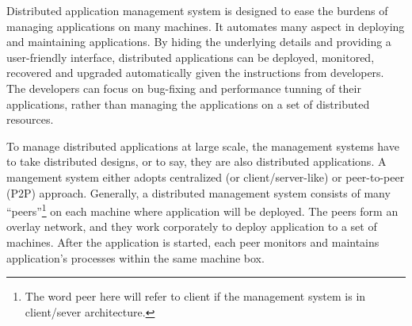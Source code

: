



Distributed application management system is designed to
ease the burdens of managing applications on many machines.
It automates many aspect in deploying and maintaining
applications. By hiding the underlying details and providing
a user-friendly interface, distributed applications can be
deployed, monitored, recovered and upgraded automatically
given the instructions from developers. The developers can
focus on bug-fixing and performance tunning of their
applications, rather than managing the applications on a set
of distributed resources.

To manage distributed applications at large scale, the
management systems have to take distributed designs, or to
say, they are also distributed applications. A mangement
system either adopts centralized (or client/server-like) or
peer-to-peer (P2P) approach.  Generally, a distributed
management system consists of many ``peers''\footnote{The
word peer here will refer to client if the management system
is in client/sever architecture.} on each machine where
application will be deployed. The peers form an overlay
network, and they work corporately to deploy application to
a set of machines. After the application is started, each
peer monitors and maintains application's processes within
the same machine box.

